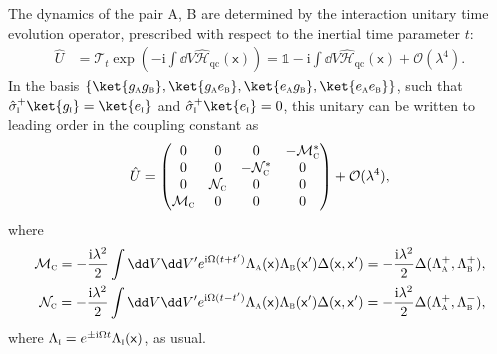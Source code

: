 \documentclass[letterpaper,12pt,titlepage,oneside,final]{book}
\newcommand{\openone}{\mathds{1}}
\newcommand{\mf}{\mathsf}%
\newcommand{\ii}{\mathrm{i}}
\newcommand{\tc}[1]{\textsc{#1}}
\begin{document}
The dynamics of the pair A, B are determined by the interaction unitary time evolution operator, prescribed with respect to the inertial time parameter $t$:
\begin{align}\label{eq:UIclass}
    \hat{U} &= \mathcal{T}_t\exp\left(-\ii \int \dd V  \hat{\mathcal{H}}_\text{qc}(\mf x)\right) = \openone - \ii \int \dd V  \hat{\mathcal{H}}_\text{qc}(\mf x) + \mathcal{O}(\lambda^4).\nonumber
\end{align}
In the basis $\{\ket{g_\textsc{a}g_\textsc{b}},\ket{g_\textsc{a}e_\textsc{b}},\ket{e_\textsc{a}g_\textsc{b}},\ket{e_\textsc{a}e_\textsc{b}}\}$, such that $\hat{\sigma}_\textsc{i}^+ \ket{g_\textsc{i}} = \ket {e_\textsc{i}}$ and $\hat{\sigma}_\textsc{i}^+ \ket{e_\textsc{i}}= 0$, this unitary can be written to leading order in the coupling constant as
\begin{equation}\label{eq:classU}
    \hat{U} = \begin{pmatrix}
        0 & 0 & 0 & -\mathcal{M}_{\textsc{c}}^*\\
        0 & 0 & -\mathcal{N}^*_{\textsc{c}} & 0 \\
        0 & \mathcal{N}_{\textsc{c}} & 0 & 0\\
        \mathcal{M}_{\textsc{c}} & 0 & 0 & 0
    \end{pmatrix} + \mathcal{O}(\lambda^4),
\end{equation}
where
\begin{align}
    \mathcal{M}_\textsc{c} = -  \frac{\ii \lambda^2}{2} \int \dd V\dd V' e^{\ii \Omega(t+t')}\Lambda_\textsc{a}(\mf x)\Lambda_\textsc{b}(\mf x')\Delta(\mf x, \mf x') = -  \frac{\ii\lambda^2}{2}\Delta(\Lambda_\tc{a}^+,\Lambda_\tc{b}^+),\nonumber \\
    \mathcal{N}_\textsc{c} = -\frac{\ii\lambda^2}{2} \int \dd V\dd V' e^{\ii \Omega(t-t')}\Lambda_\textsc{a}(\mf x)\Lambda_\textsc{b}(\mf x')\Delta(\mf x, \mf x') = - \frac{\ii\lambda^2}{2}\Delta(\Lambda_\tc{a}^+,\Lambda_\tc{b}^-),\label{eq:McNc}
\end{align}
where $\Lambda_\tc{i} =  e^{\pm\ii \Omega t}\Lambda_\tc{i}(\mf x)$, as usual.
\end{document}
